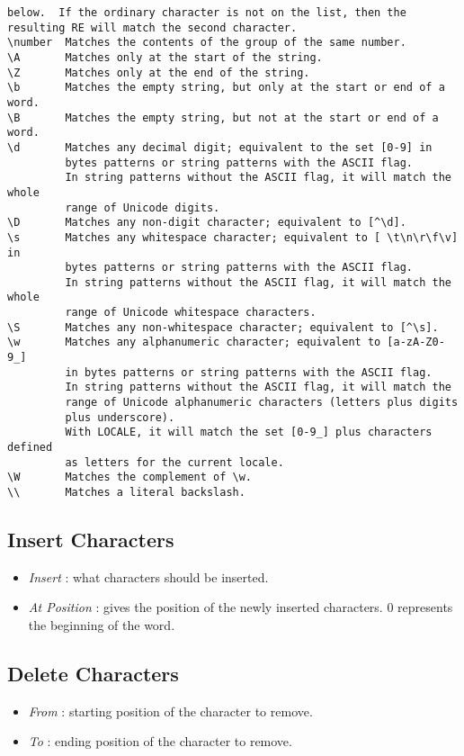 \documentclass[12pt, a4paper]{scrartcl}
\begin{document}
\begin{itemize}
\begin{verbatim}
below.  If the ordinary character is not on the list, then the
resulting RE will match the second character.
\number  Matches the contents of the group of the same number.
\A       Matches only at the start of the string.
\Z       Matches only at the end of the string.
\b       Matches the empty string, but only at the start or end of a word.
\B       Matches the empty string, but not at the start or end of a word.
\d       Matches any decimal digit; equivalent to the set [0-9] in
         bytes patterns or string patterns with the ASCII flag.
         In string patterns without the ASCII flag, it will match the whole
         range of Unicode digits.
\D       Matches any non-digit character; equivalent to [^\d].
\s       Matches any whitespace character; equivalent to [ \t\n\r\f\v] in
         bytes patterns or string patterns with the ASCII flag.
         In string patterns without the ASCII flag, it will match the whole
         range of Unicode whitespace characters.
\S       Matches any non-whitespace character; equivalent to [^\s].
\w       Matches any alphanumeric character; equivalent to [a-zA-Z0-9_]
         in bytes patterns or string patterns with the ASCII flag.
         In string patterns without the ASCII flag, it will match the
         range of Unicode alphanumeric characters (letters plus digits
         plus underscore).
         With LOCALE, it will match the set [0-9_] plus characters defined
         as letters for the current locale.
\W       Matches the complement of \w.
\\       Matches a literal backslash.

\end{verbatim}
\endgroup
\end{itemize}
\subsection{Insert Characters}
\begin{itemize}
    \item \emph{Insert} : what characters should be inserted.
    \item \emph{At Position} : gives the position of the newly inserted characters. 0 represents the beginning of the word.
\end{itemize}
\subsection{Delete Characters}
\begin{itemize}
    \item \emph{From} : starting position of the character to remove.
    \item \emph{To} : ending position of the character to remove.
\end{itemize}
\end{document}
